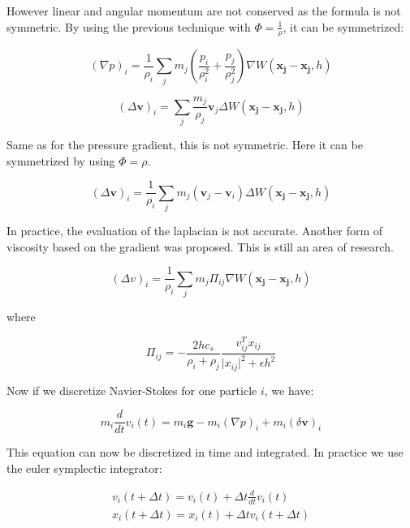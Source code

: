\documentclass[11pt, oneside, a4paper]{memoir}
\begin{document}
However linear and angular momentum are not conserved as the formula is not symmetric. By using the previous technique with $\Phi = \frac{1}{\rho}$, it can be symmetrized:

\begin{equation}
\left(\nabla p\right)_{i} = 
\frac{1}{\rho_{i}}
\sum_{j} m_{j} \left( \frac{p_{i}}{\rho_{i}^{2}} + \frac{p_{j}}{\rho_{j}^{2}} \right) \nabla W(\mathbf{x_{j}}-\mathbf{x_{j}},h)
\end{equation}

\begin{equation}
\left(\Delta \mathbf{v}\right)_{i} = \sum_{j} \frac{m_{j}}{\rho_{j}} \mathbf{v}_{j} \Delta W(\mathbf{x_{j}}-\mathbf{x_{j}},h)
\end{equation}

Same as for the pressure gradient, this is not symmetric. Here it can be symmetrized by using $\Phi = \rho$.

\begin{equation}
\left(\Delta \mathbf{v}\right)_{i} = \frac{1}{\rho_{i}}\sum_{j} m_{j} \left( \mathbf{v}_{j}-\mathbf{v}_{i}\right) \Delta W(\mathbf{x_{j}}-\mathbf{x_{j}},h)
\end{equation}

In practice, the evaluation of the laplacian is not accurate. Another form of viscosity based on the gradient was proposed. This is still an area of research.

\begin{equation}
\left(\Delta v\right)_{i} = 
\frac{1}{\rho_{i}}
\sum_{j} m_{j} \Pi_{ij} \nabla W(\mathbf{x_{j}}-\mathbf{x_{j}},h)
\end{equation}

where 

\begin{equation}
\Pi_{ij} = -\frac{2hc_{s}}{\rho_{i}+\rho_{j}}\frac{v_{ij}^{T}x_{ij}}{\vert x_{ij} \vert^{2} + \epsilon h^{2}}
\end{equation}

Now if we discretize Navier-Stokes for one particle $i$, we have:

\begin{equation}
m_{i}\frac{d}{dt}v_{i}(t) = m_{i}\mathbf{g} - m_{i}(\nabla p)_{i} + m_{i}(\delta \mathbf{v})_{i}
\end{equation}

This equation can now be discretized in time and integrated. In practice we use the euler symplectic integrator:

\begin{equation}
\begin{array}{ll}
v_{i}(t+\Delta t) = v_{i}(t) + \Delta t \frac{d}{dt}v_{i}(t) \\
x_{i}(t+\Delta t) = x_{i}(t) + \Delta t v_{i}(t+\Delta t)
\end{array}
\end{equation}
\end{document}
